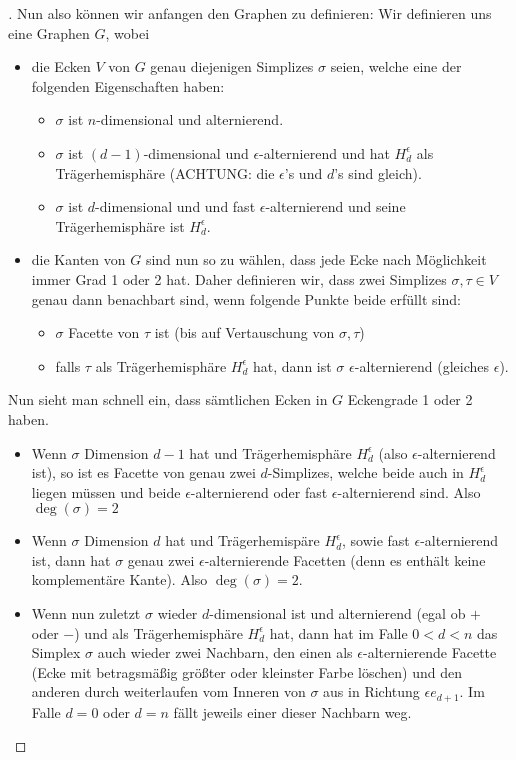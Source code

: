 \documentclass[10pt,a4paper]{article}
\begin{document}
\begin{proof}[]
Nun also können wir anfangen den Graphen zu definieren: Wir definieren uns eine Graphen $G$, wobei
\begin{itemize}
\item die Ecken $V$ von $G$ genau diejenigen Simplizes $\sigma$ seien, welche eine der folgenden Eigenschaften haben:
\begin{itemize}
\item $\sigma$ ist $n$-dimensional und alternierend. 
\item $\sigma$ ist $(d-1)$-dimensional und $\epsilon$-alternierend und hat $H^\epsilon_d$ als Trägerhemisphäre (ACHTUNG: die $\epsilon$'s und $d$'s sind gleich).
\item $\sigma$ ist $d$-dimensional und und fast $\epsilon$-alternierend und seine Trägerhemisphäre ist $H^\epsilon_d$.
\end{itemize}
\item die Kanten von $G$ sind nun so zu wählen, dass jede Ecke nach Möglichkeit immer Grad 1 oder 2 hat.
Daher definieren wir, dass zwei Simplizes $\sigma,\tau\in V$ genau dann benachbart sind, wenn folgende Punkte beide erfüllt sind:
\begin{itemize}
\item $\sigma$ Facette von $\tau$ ist (bis auf Vertauschung von $\sigma, \tau$)
\item falls $\tau$ als Trägerhemisphäre $H^\epsilon_d$ hat, dann ist $\sigma$ $\epsilon$-alternierend (gleiches $\epsilon$).
\end{itemize}
\end{itemize}

Nun sieht man schnell ein, dass sämtlichen Ecken in $G$ Eckengrade 1 oder 2 haben.
\begin{itemize}
\item Wenn $\sigma$ Dimension $d-1$ hat und Trägerhemisphäre $H^\epsilon_d$ (also $\epsilon$-alternierend ist), so ist es Facette von genau zwei $d$-Simplizes, welche beide auch in $H^\epsilon_d$ liegen müssen und beide $\epsilon$-alternierend oder fast $\epsilon$-alternierend sind. Also $\deg(\sigma)=2$
\item Wenn $\sigma$ Dimension $d$ hat und Trägerhemispäre $H^\epsilon_d$, sowie fast $\epsilon$-alternierend ist, dann hat $\sigma$ genau zwei $\epsilon$-alternierende Facetten (denn es enthält keine komplementäre Kante). Also $\deg(\sigma)=2$.
\item Wenn nun zuletzt $\sigma$ wieder $d$-dimensional ist und alternierend (egal ob $+$ oder $-$) und als Trägerhemisphäre $H^\epsilon_d$ hat, dann hat im Falle $0<d<n$ das Simplex $\sigma$ auch wieder zwei Nachbarn, den einen als $\epsilon$-alternierende Facette (Ecke mit betragsmäßig größter oder kleinster Farbe löschen) und den anderen durch weiterlaufen vom Inneren von $\sigma$ aus in Richtung $\epsilon e_{d+1}$.
Im Falle $d=0$ oder $d=n$ fällt jeweils einer dieser Nachbarn weg.
\end{itemize}


\end{proof}
\end{document}
